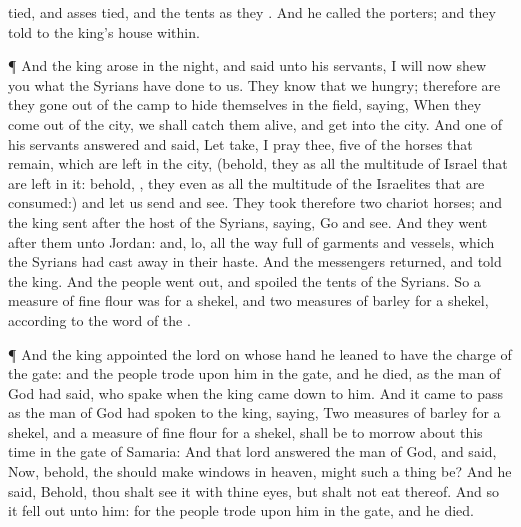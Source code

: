 {tied, and
asses
tied, and the
tents as they
{}.
And he
called the
porters; and they
told
{} to the
king’s
house
within.
\par }{\PP {}¶ And the
king
arose in the
night, and
said unto his
servants, I will now
shew you what the
Syrians have
done to us. They
know that we
{}
hungry; therefore are they gone
out of the
camp to
hide themselves in the
field,
saying, When they come
out of the
city, we shall
catch them
alive, and
get into the
city.
And
one of his
servants
answered and
said, Let
{}
take, I pray thee,
five of the
horses that
remain, which are
left in the city, (behold, they
{} as all the
multitude of
Israel that are
left in it: behold,
{}, they
{} even as all the
multitude of the
Israelites that are
consumed:) and let us
send and
see.
They
took therefore
two
chariot
horses; and the
king
sent
after the
host of the
Syrians,
saying,
Go and
see.
And they
went
after them unto
Jordan: and, lo, all the
way
{}
full of
garments and
vessels, which the
Syrians had cast
away in their
haste. And the
messengers
returned, and
told the
king.
And the
people went
out, and
spoiled the
tents of the
Syrians. So a
measure of fine
flour was
{} for a
shekel, and two
measures of
barley for a
shekel, according to the
word of the
{}.
\par }{\PP {}¶ And the
king
appointed the
lord on whose
hand he
leaned to have the charge of the
gate: and the
people
trode upon him in the
gate, and he
died, as the
man of
God had
said, who
spake when the
king came
down to him.
And it came to pass as the
man of
God had
spoken to the
king,
saying, Two
measures of
barley for a
shekel, and a
measure of fine
flour for a
shekel, shall be to
morrow about this
time in the
gate of
Samaria:
And that
lord
answered the
man of
God, and
said, Now, behold,
{} the
{} should
make
windows in
heaven, might such a
thing be? And he
said, Behold, thou shalt
see it with thine
eyes, but shalt not
eat thereof.
And so it fell out unto him: for the
people
trode upon him in the
gate, and he
died.

}
